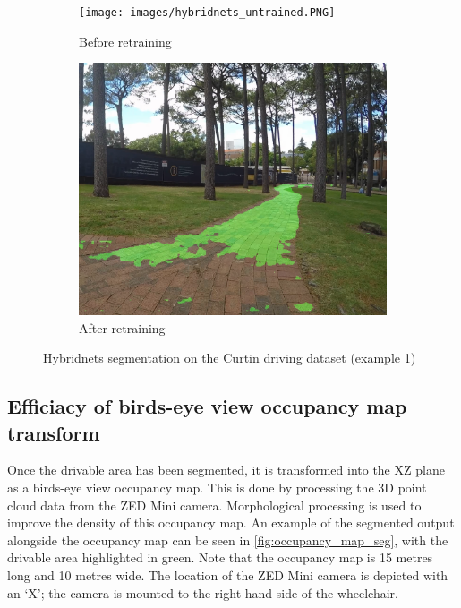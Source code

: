 \begin{figure}[b]
    \centering
    \begin{subfigure}{.4\textwidth}
        \centering
        \texttt{[image: images/hybridnets\_untrained.PNG]}
        \caption{Before retraining}
    \end{subfigure}
    \quad
    \begin{subfigure}{.4\textwidth}
        \centering
        \includegraphics[width=\linewidth]{images/hybridnets_trained.PNG}
        \caption{After retraining}
    \end{subfigure}
    \caption{Hybridnets segmentation on the Curtin driving dataset (example 1)}
    \label{fig:compare_trained_hybridnets}
\end{figure}

\pagebreak
\subsection{Efficiacy of birds-eye view occupancy map transform}
Once the drivable area has been segmented, it is transformed into the XZ plane
as a birds-eye view occupancy map. This is done by processing the 3D point cloud
data from the ZED Mini camera.
Morphological processing is used to improve the density of this occupancy map.
An example of the segmented output alongside the occupancy map can be seen in \cref{fig:occupancy_map_seg},
with the drivable area highlighted in green.
Note that the occupancy map is 15 metres long and 10 metres wide. The location of the ZED Mini camera is depicted
with an `X'; the camera is mounted to the right-hand side of the wheelchair.

